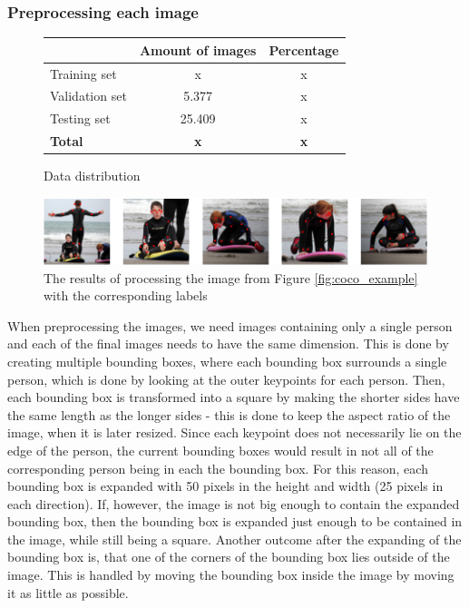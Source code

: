 \documentclass[main.tex]{subfiles}
\begin{document}
\subsubsection{Preprocessing each image}
\begin{figure}[H]
    \centering
    \begin{tabular}{l|c|c}
         & Amount of images & Percentage \\
        \hline
        Training set & x & x \\
        \hline
        Validation set & 5.377 & x \\
        \hline
        Testing set & 25.409 & x \\
        \hline
        \hline
        \textbf{Total} & \textbf{x} & \textbf{x} \\
        \hline
    \end{tabular}
    \caption{Data distribution}
    \label{tab:data_distribution}
\end{figure}
\begin{figure}[H]
    \centering
    \includegraphics[width = \textwidth - 2 cm]{../entities/crop_img.PNG}
    \caption{The results of processing the image from Figure \ref{fig:coco_example} with the corresponding labels}
    \label{fig:crop_img}
\end{figure}
When preprocessing the images, we need images containing only a single person and each of the final images needs to have the same dimension. This is done by creating multiple bounding boxes, where each bounding box surrounds a single person, which is done by looking at the outer keypoints for each person. Then, each bounding box is transformed into a square by making the shorter sides have the same length as the longer sides - this is done to keep the aspect ratio of the image, when it is later resized. Since each keypoint does not necessarily lie on the edge of the person, the current bounding boxes would result in not all of the corresponding person being in each the bounding box. For this reason, each bounding box is expanded with 50 pixels in the height and width (25 pixels in each direction). If, however, the image is not big enough to contain the expanded bounding box, then the bounding box is expanded just enough to be contained in the image, while still being a square. Another outcome after the expanding of the bounding box is, that one of the corners of the bounding box lies outside of the image. This is handled by moving the bounding box inside the image by moving it as little as possible. \\
\end{document}
